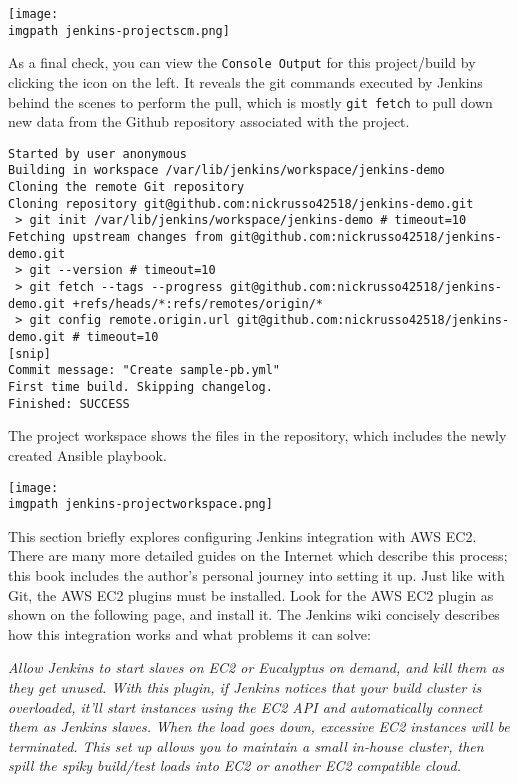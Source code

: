     \begin{minipage}[t]{\linewidth}
	  \centering
      \texttt{[image: \\imgpath jenkins-projectscm.png]}
    \end{minipage}

As a final check, you can view the \verb|Console Output| for this
project/build by clicking the icon on the left. It reveals the git commands
executed by Jenkins behind the scenes to perform the pull, which is mostly
\verb|git fetch| to pull down new data from the Github repository associated
with the project.

\begin{verbatim}
Started by user anonymous
Building in workspace /var/lib/jenkins/workspace/jenkins-demo
Cloning the remote Git repository
Cloning repository git@github.com:nickrusso42518/jenkins-demo.git
 > git init /var/lib/jenkins/workspace/jenkins-demo # timeout=10
Fetching upstream changes from git@github.com:nickrusso42518/jenkins-demo.git
 > git --version # timeout=10
 > git fetch --tags --progress git@github.com:nickrusso42518/jenkins-demo.git +refs/heads/*:refs/remotes/origin/*
 > git config remote.origin.url git@github.com:nickrusso42518/jenkins-demo.git # timeout=10
[snip]
Commit message: "Create sample-pb.yml"
First time build. Skipping changelog.
Finished: SUCCESS
\end{verbatim}

The project workspace shows the files in the repository, which includes
the newly created Ansible playbook.

    \begin{minipage}[t]{\linewidth}
	  \centering
      \texttt{[image: \\imgpath jenkins-projectworkspace.png]}
    \end{minipage}

This section briefly explores configuring Jenkins integration with AWS EC2.
There are many more detailed guides on the Internet which describe this
process; this book includes the author's personal journey into setting it up.
Just like with Git, the AWS EC2 plugins must be installed. Look for the AWS
EC2 plugin as shown on the following page, and install it. The Jenkins wiki
concisely describes how this integration works and what problems it can solve:

\textit{
Allow Jenkins to start slaves on EC2 or Eucalyptus on demand, and kill them as
they get unused. With this plugin, if Jenkins notices that your build cluster
is overloaded, it'll start instances using the EC2 API and automatically
connect them as Jenkins slaves. When the load goes down, excessive EC2
instances will be terminated. This set up allows you to maintain a small
in-house cluster, then spill the spiky build/test loads into EC2 or another
EC2 compatible cloud.
}

